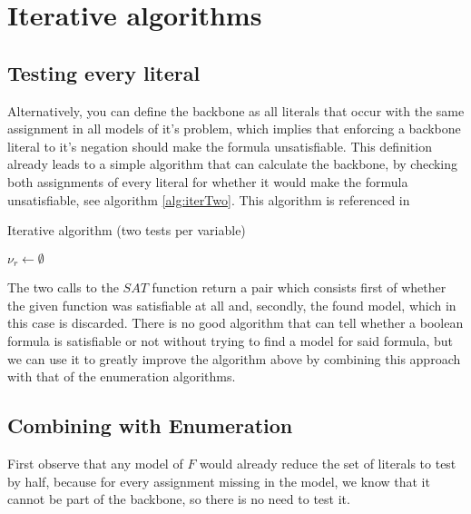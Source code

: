 \section{Iterative algorithms}
\label{sec:iterative}
\subsection{Testing every literal}
Alternatively, you can define the backbone as all literals that occur with the same assignment in all models of it's problem, which implies that enforcing a backbone literal to it's negation should make the formula unsatisfiable. This definition already leads to a simple algorithm that can calculate the backbone, by checking both assignments of every literal for whether it would make the formula unsatisfiable, see algorithm \ref{alg:iterTwo}. This algorithm is referenced in \cite{mjl10}
\begin{algorithm}
\caption{{\sc Iterative algorithm (two tests per variable)}}
\label{alg:iterTwo}
\DontPrintSemicolon
{}
$\nu_r \gets \emptyset$\;
\;
\end{algorithm}

The two calls to the $SAT$ function return a pair which consists first of whether the given function was satisfiable at all and, secondly, the found model, which in this case is discarded. There is no good algorithm that can tell whether a boolean formula is satisfiable or not without trying to find a model for said formula, but we can use it to greatly improve the algorithm above by combining this approach with that of the enumeration algorithms.

\subsection{Combining with Enumeration}
First observe that any model of $F$ would already reduce the set of literals to test by half, because for every assignment missing in the model, we know that it cannot be part of the backbone, so there is no need to test it. 

